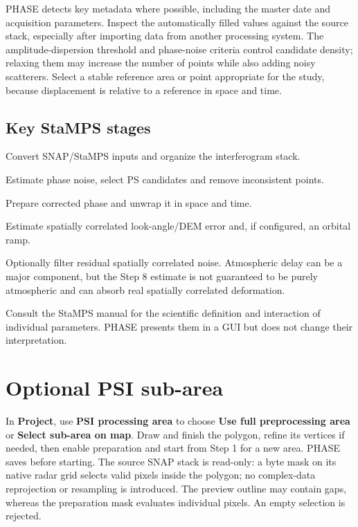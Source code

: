 PHASE detects key metadata where possible, including the master date and acquisition parameters. Inspect the automatically filled values against the source stack, especially after importing data from another processing system. The amplitude-dispersion threshold and phase-noise criteria control candidate density; relaxing them may increase the number of points while also adding noisy scatterers. Select a stable reference area or point appropriate for the study, because displacement is relative to a reference in space and time.

\subsection{Key StaMPS stages}
\begin{description}[style=nextline]
\item[Step 1 --- data preparation] Convert SNAP/StaMPS inputs and organize the interferogram stack.
\item[Steps 2--4 --- estimation and selection] Estimate phase noise, select PS candidates and remove inconsistent points.
\item[Steps 5--6 --- correction and unwrapping] Prepare corrected phase and unwrap it in space and time.
\item[Step 7 --- SCLA and ramp] Estimate spatially correlated look-angle/DEM error and, if configured, an orbital ramp.
\item[Step 8 --- spatially correlated noise] Optionally filter residual spatially correlated noise. Atmospheric delay can be a major component, but the Step 8 estimate is not guaranteed to be purely atmospheric and can absorb real spatially correlated deformation.
\end{description}

Consult the StaMPS manual for the scientific definition and interaction of individual parameters. PHASE presents them in a GUI but does not change their interpretation.

\section{Optional PSI sub-area}\label{sec:psi-subarea}
In \textbf{Project}, use \textbf{PSI processing area} to choose \textbf{Use full preprocessing area} or \textbf{Select sub-area on map}. Draw and finish the polygon, refine its vertices if needed, then enable preparation and start from Step 1 for a new area. PHASE saves before starting. The source SNAP stack is read-only: a byte mask on its native radar grid selects valid pixels inside the polygon; no complex-data reprojection or resampling is introduced. The preview outline may contain gaps, whereas the preparation mask evaluates individual pixels. An empty selection is rejected.

